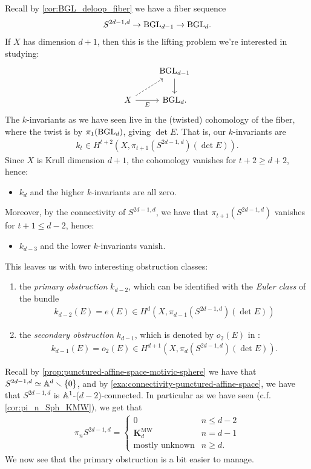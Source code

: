 \documentclass[11pt,openany]{book}
\providecommand{\KMW}{\mathbf{K}^\mathrm{MW}}
\begin{document}
Recall by \autoref{cor:BGL_deloop_fiber} we have a fiber sequence
\begin{align*}
    S^{2d-1,d} \to \mathrm{BGL}_{d-1} \to \mathrm{BGL}_d.
\end{align*}
If $X$ has dimension $d+1$, then this is the lifting problem we're interested in studying:
\[ \begin{tikzcd}
     & \BGL_{d-1}\dar\\
    X\rar["E" below]\ar[ur,dashed] & \BGL_d.
\end{tikzcd} \]
%
The $k$-invariants as we have seen live in the (twisted) cohomology of the fiber, where the twist is by $\pi_1(\mathrm{BGL}_d)$, giving $\det E$. That is, our $k$-invariants are
\begin{align*}
    k_t \in H^{t+2}(X,\pi_{t+1}(S^{2d-1,d})(\det E)).
\end{align*}
%
Since $X$ is Krull dimension $d+1$, the cohomology vanishes for $t+2 \ge d+2$, hence:
\begin{itemize}
    \item $k_d$ and the higher $k$-invariants are all zero.
\end{itemize}
Moreover, by the connectivity of $S^{2d-1,d}$, we have that $\pi_{t+1}(S^{2d-1,d})$ vanishes for $t+1\le d-2$, hence:
\begin{itemize}
    \item $k_{d-3}$ and the lower $k$-invariants vanish.
\end{itemize}
This leaves us with two interesting obstruction classes:
\begin{enumerate}
    \item the \textit{primary obstruction} $k_{d-2}$, which can be identified with the \textit{Euler class} of the bundle
    \begin{align*}
        k_{d-2}(E) = e(E) \in H^d(X,\pi_{d-1}(S^{2d-1,d})(\det E))
    \end{align*}
    \item the \textit{secondary obstruction} $k_{d-1}$, which is denoted by $o_2(E)$ in \cite{ABH-Freudenthal}:
    \begin{align*}
        k_{d-1}(E) = o_2(E) \in H^{d+1}(X,\pi_{d}(S^{2d-1,d})(\det E)).
    \end{align*}
\end{enumerate}
Recall by \autoref{prop:punctured-affine-space-motivic-sphere} we have that $S^{2d-1,d}\simeq \mathbb{A}^d\smallsetminus\{0\}$, and by \autoref{exa:connectivity-punctured-affine-space}, we have that $S^{2d-1,d}$ is $\mathbb{A}^1$-($d-2$)-connected. In particular as we have seen (c.f. \autoref{cor:pi_n_Sph_KMW}), we get that
\begin{align*}
    \pi_n S^{2d-1,d} = \begin{cases} 0 & n\le d-2 \\ \KMW_d & n=d-1 \\ \text{mostly unknown} & n\ge d.\end{cases}
\end{align*}
We now see that the primary obstruction is a bit easier to manage.
\end{document}
